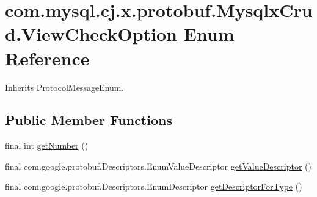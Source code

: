 \hypertarget{enumcom_1_1mysql_1_1cj_1_1x_1_1protobuf_1_1_mysqlx_crud_1_1_view_check_option}{}\section{com.\+mysql.\+cj.\+x.\+protobuf.\+Mysqlx\+Crud.\+View\+Check\+Option Enum Reference}
\label{enumcom_1_1mysql_1_1cj_1_1x_1_1protobuf_1_1_mysqlx_crud_1_1_view_check_option}


Inherits Protocol\+Message\+Enum.

\subsection*{Public Member Functions}
\begin{DoxyCompactItemize}
\item 
final int \mbox{\hyperlink{enumcom_1_1mysql_1_1cj_1_1x_1_1protobuf_1_1_mysqlx_crud_1_1_view_check_option_af132817e26fa30ec0130784233d01805}{get\+Number}} ()
\item 
final com.\+google.\+protobuf.\+Descriptors.\+Enum\+Value\+Descriptor \mbox{\hyperlink{enumcom_1_1mysql_1_1cj_1_1x_1_1protobuf_1_1_mysqlx_crud_1_1_view_check_option_a3b84aaf0adf5912cec5a7df3560b36d9}{get\+Value\+Descriptor}} ()
\item 
final com.\+google.\+protobuf.\+Descriptors.\+Enum\+Descriptor \mbox{\hyperlink{enumcom_1_1mysql_1_1cj_1_1x_1_1protobuf_1_1_mysqlx_crud_1_1_view_check_option_af1ca234a086692b38e2dd64eff823439}{get\+Descriptor\+For\+Type}} ()
\end{DoxyCompactItemize}
